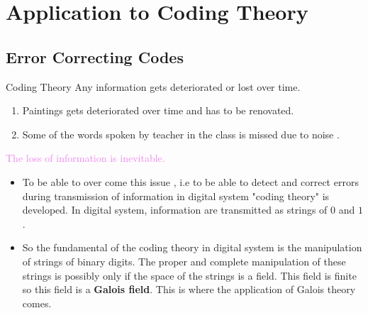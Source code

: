 \documentclass{beamer}
\begin{document}
\section{Application to Coding Theory}
\subsection{Error Correcting Codes}
\begin{frame}{Coding Theory}
  Any information gets deteriorated or lost over time.

\begin{enumerate}
\item Paintings gets deteriorated over time and has to be renovated.
\item Some of the words spoken by teacher in the class is missed due to noise \cite{coding}.
\end{enumerate}
\vspace{3mm}
\textcolor{violet}{The loss of information is inevitable.}
\begin{itemize}
\item To be able to over come this issue , i.e \textcolor{green!50!black}{to be able to detect and correct errors during transmission} of information in digital system "coding theory" is developed. In digital system, information are transmitted as strings of \(0\) and \(1\).

\item So \textcolor{green!50!black}{the fundamental of the coding theory in digital system is the manipulation of strings of binary digits}. The proper and complete manipulation of these strings is possibly only if the space of the strings is a field. This field is finite so this field is a \textbf{Galois field}. This is where the application of Galois theory comes.
  \end{itemize}
\end{frame}
\end{document}
